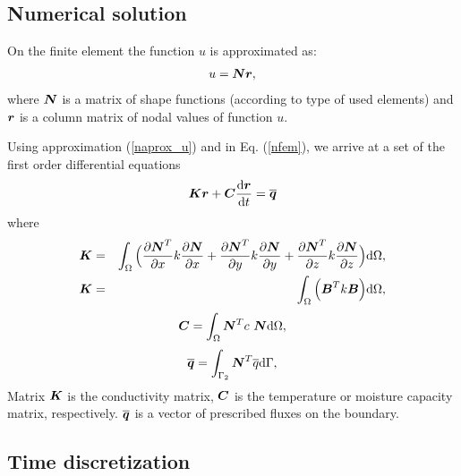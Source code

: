 \subsection{Numerical solution}

On the finite element  the function $u$ is approximated as:
\begin{eqnarray}\label{naprox_u}
u = \mbox{\boldmath$Nr$},
\end{eqnarray}
where $\mbox{\boldmath$N$}$ is a matrix of shape  functions (according to type of used elements) 
and $\mbox{\boldmath$r$}$ is a column matrix of nodal values of function $u$.

Using approximation (\ref{naprox_u}) and in Eq. (\ref{nfem}), 
we arrive at a set of the first order differential equations
\begin{eqnarray}\label{nfemmatr}
\mbox{\boldmath$Kr$} + \mbox{\boldmath$C$} \frac{{\rm d}\mbox{\boldmath$r$}}{{\rm d}t} = \overline{\mbox{\boldmath$q$}}
\end{eqnarray}
where
\begin{eqnarray}\label{nkint}
\mbox{\boldmath$K$} &=& \int_{\Omega} \Big(\frac{\partial \mbox{\boldmath$N$}^T}{\partial x}k \frac{\partial \mbox{\boldmath$N$}}{\partial x} 
+ \frac{\partial \mbox{\boldmath$N$}^T}{\partial y}k \frac{\partial \mbox{\boldmath$N$}}{\partial y} + 
\frac{\partial \mbox{\boldmath$N$}^T}{\partial z}k \frac{\partial \mbox{\boldmath$N$}}{\partial z}\Big){\rm d}\Omega,\nonumber\\
\mbox{\boldmath$K$} &=& \int_{\Omega}  \Big(\mbox{\boldmath$B$}^T k \mbox{\boldmath$B$}\Big){\rm d}\Omega,
\end{eqnarray}
\begin{eqnarray}
\mbox{\boldmath$C$} = \int_{\Omega} \mbox{\boldmath$N$}^T c\ \mbox{\boldmath$N$} {\rm d}\Omega,
\end{eqnarray}
\begin{eqnarray}
\overline{\mbox{\boldmath$q$}} = \int_{\Gamma_2} \mbox{\boldmath$N$}^T  \overline{q}{\rm d}\Gamma,
\end{eqnarray}
Matrix $\mbox{\boldmath$K$}$ is the conductivity matrix, $\mbox{\boldmath$C$}$ is the temperature or moisture 
capacity matrix, respectively. $\mbox{\boldmath$\overline{q}$}$ is a vector of prescribed fluxes on the boundary. 

\subsection{Time discretization}

